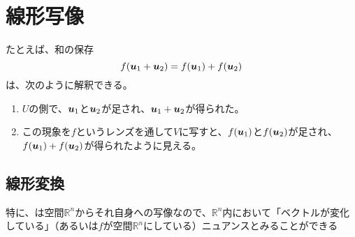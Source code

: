 \documentclass[../../../topic_linear-algebra]{subfiles}
\begin{document}
\sectionline
\section{線形写像}

たとえば、和の保存
\begin{equation*}
  f(\vb*{u}_1 + \vb*{u}_2) = f(\vb*{u}_1) + f(\vb*{u}_2)
\end{equation*}
は、次のように解釈できる。

\begin{enumerate}
  \item $U$の側で、$\vb*{u}_1$と$\vb*{u}_2$が足され、$\vb*{u}_1 + \vb*{u}_2$が得られた。
  \item この現象を$f$というレンズを通して$V$に写すと、$f(\vb*{u}_1)$と$f(\vb*{u}_2)$が足され、$f(\vb*{u}_1) + f(\vb*{u}_2)$が得られたように見える。
\end{enumerate}

\subsection{線形変換}

特に、は空間$\mathbb{R}^n$からそれ自身への写像なので、$\mathbb{R}^n$内において「ベクトルが変化している」（あるいは$f$が空間$\mathbb{R}^n$にしている）ニュアンスとみることができる
\end{document}
